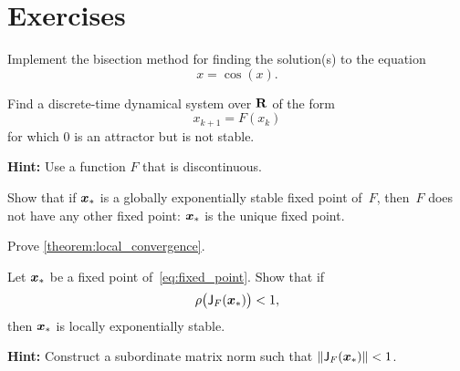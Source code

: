 \section{Exercises}

\begin{compexercise}
Implement the bisection method for finding the solution(s) to the equation
\[
    x = \cos(x).
\]
\end{compexercise}

\begin{exercise}
    Find a discrete-time dynamical system over $\mathbf R$ of the form
    \[
        x_{k+1} = F(x_{k})
    \]
    for which $0$ is an attractor but is not stable.

    \noindent \textbf{Hint:} Use a function $F$ that is discontinuous.
\end{exercise}

\begin{exercise}
    \label{exercise:global_exponential_stability}
    Show that if $\mathbf{\boldsymbol{x}}_*$ is a globally exponentially stable fixed point of~$F$,
    then~$F$ does not have any other fixed point: $\mathbf{\boldsymbol{x}}_*$ is the unique fixed point.
\end{exercise}

\begin{exercise}
    \label{exercise:prove_local_convergence}
    Prove \cref{theorem:local_convergence}.
\end{exercise}

\begin{exercise}
    Let $\mathbf{\boldsymbol{x}}_*$ be a fixed point of~\eqref{eq:fixed_point}.
    Show that if
    \[
        \rho\bigl(\mathsf J_F(\mathbf{\boldsymbol{x}}_*)\bigr) < 1,
    \]
    then $\mathbf{\boldsymbol{x}}_*$ is locally exponentially stable.

    \noindent \textbf{Hint:} Construct a subordinate matrix norm such that $\lVert\mathsf J_F(\mathbf{\boldsymbol{x}}_*)\rVert < 1$.
\end{exercise}
